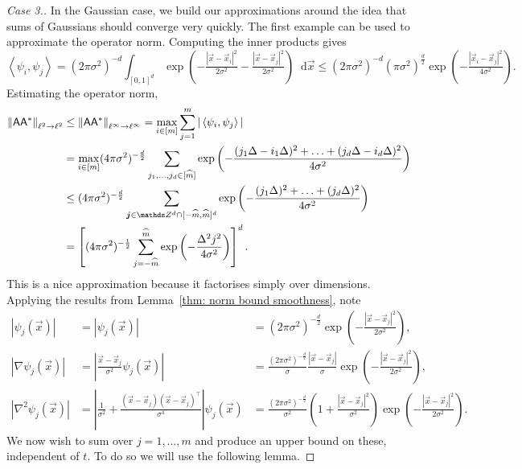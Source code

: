 \documentclass[smallextended]{svjour3}
\let\F\mathds\let\C\mathcal\newcommand{\R}{\F{R}}\newcommand{\A}{\tens{A}}
\newcommand{\norm}[1]{{\left\lVert #1 \right\rVert}}
\newcommand{\IP}[2]{\left\langle #1,#2 \right\rangle}
\newcommand{\1}{\F{1}}
\renewcommand{\hat}{\widehat}\renewcommand{\tilde}{\widetilde}
\newcommand{\diff}{\mathop{}\!\mathrm{d}}
\begin{document}
	\begin{proof}[Case 3.]
		In the Gaussian case, we build our approximations around the idea that sums of Gaussians should converge very quickly. The first example can be used to approximate the operator norm. Computing the inner products gives
		\begin{equation}
			\IP{\psi_i}{\psi_j} = (2\pi\sigma^2)^{-d}\int_{[0,1]^d} \exp\left(-\tfrac{|\vec{x}-\vec{x}_i|^2}{2\sigma^2}-\tfrac{|\vec{x}-\vec{x}_j|^2}{2\sigma^2}\right)\diff\vec{x} \leq (2\pi\sigma^2)^{-d}(\pi\sigma^2)^{\frac{d}{2}}\exp\left(-\tfrac{|\vec{x}_i-\vec{x}_j|^2}{4\sigma^2}\right).
		\end{equation}
		Estimating the operator norm,
		\begin{align}
			\norm{\A\A^*}_{\ell^2\to\ell^2}&\leq \norm{\A\A^*}_{\ell^\infty\to\ell^\infty} = \max_{i\in[m]} \sum_{j=1}^m |\IP{\psi_i}{\psi_j}| 
			\\&= \max_{i\in[m]}(4\pi\sigma^2)^{-\frac d2}\sum_{j_1,\ldots,j_d\in[\hat m]} \exp\left(-\frac{(j_1\Delta-i_1\Delta)^2+\ldots+(j_d\Delta-i_d\Delta)^2}{4\sigma^2}\right)
			\\&\leq (4\pi\sigma^2)^{-\frac d2}\sum_{\vec j\in\F Z^d\cap[-\hat m,\hat m]^d} \exp\left(-\frac{(j_1\Delta)^2+\ldots+(j_d\Delta)^2}{4\sigma^2}\right)
			\\&= \left[(4\pi\sigma^2)^{-\frac 12}\sum_{j=-\hat m}^{\hat m} \exp\left(-\frac{\Delta^2j^2}{4\sigma^2}\right)\right]^d.
		\end{align}
		This is a nice approximation because it factorises simply over dimensions.
		Applying the results from Lemma~\ref{thm: norm bound smoothness}, note
		$$\begin{array}{rll}
			\displaystyle |\psi_j(\vec{x})| &\displaystyle= \left|\psi_j(\vec{x})\right| &\displaystyle = (2\pi\sigma^2)^{-\frac d2}\exp\left(-\frac{|\vec{x}-\vec{x}_j|^2}{2\sigma^2}\right),
			\\\displaystyle |\nabla\psi_j(\vec{x})| &\displaystyle= \left|\frac{\vec{x}-\vec{x}_j}{\sigma^2}\psi_j(\vec{x})\right| &\displaystyle = \frac{(2\pi\sigma^2)^{-\frac d2}}{\sigma}\frac{|\vec{x}-\vec{x}_j|}{\sigma}\exp\left(-\frac{|\vec{x}-\vec{x}_j|^2}{2\sigma^2}\right),
			\\|\nabla^2\psi_j(\vec{x})| &\displaystyle =\left|\frac1{\sigma^2} + \frac{(\vec{x}-\vec{x}_j)(\vec{x}-\vec{x}_j)^\top }{\sigma^4}\right|\psi_j(\vec{x}) &\displaystyle = \frac{(2\pi\sigma^2)^{-\frac d2}}{\sigma^2}\left(1+\frac{|\vec{x}-\vec{x}_j|^2}{\sigma^2}\right)\exp\left(-\frac{|\vec{x}-\vec{x}_j|^2}{2\sigma^2}\right).
		\end{array}$$
		We now wish to sum over $j=1,\ldots,m$ and produce an upper bound on these, independent of $t$. To do so we will use the following lemma.
		

\end{proof}
\end{document}
